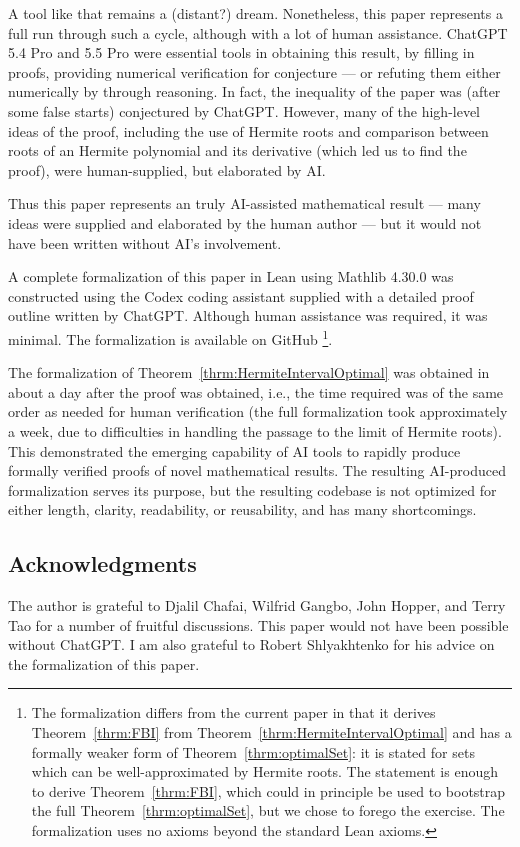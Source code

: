 A tool like that remains a (distant?) dream. Nonetheless, this paper represents a full run through such a cycle, although with a lot of human assistance. ChatGPT 5.4 Pro and 5.5 Pro were essential tools in obtaining this result, by filling in proofs, providing numerical verification for conjecture --- or refuting them either numerically by through reasoning. In fact, the inequality of the paper was  (after some false starts) conjectured by ChatGPT.  However, many of the high-level ideas of the proof, including the use of Hermite roots and comparison between roots of an Hermite polynomial and its derivative (which led us to find the proof), were human-supplied, but elaborated by AI.  

Thus this paper represents an truly AI-assisted mathematical result --- many ideas were supplied and elaborated by the human author --- but it would not have been written without AI's involvement.

A complete formalization of this paper in Lean using Mathlib 4.30.0 was constructed using the Codex coding assistant supplied with a detailed proof outline written by ChatGPT. Although human assistance was required, it was minimal. The formalization is available on GitHub \cite{githublink}\footnote{The formalization differs from the current paper in that it derives Theorem~\ref{thrm:FBI} from Theorem~\ref{thrm:HermiteIntervalOptimal} and has a formally weaker form of Theorem~\ref{thrm:optimalSet}: it is stated for sets which can be well-approximated by Hermite roots. The statement is enough to derive Theorem~\ref{thrm:FBI}, which could in principle be used to bootstrap the full Theorem~\ref{thrm:optimalSet}, but we chose to forego the exercise. The formalization uses no axioms beyond the standard Lean axioms.}.

The formalization of Theorem~\ref{thrm:HermiteIntervalOptimal} was obtained in about a day after the proof was obtained, i.e., the time required was of the same order as needed for human verification (the full formalization took approximately a week, due to difficulties in handling the passage to the limit of Hermite roots). This demonstrated the emerging capability of AI tools to rapidly produce formally verified proofs of novel mathematical results.   The resulting AI-produced formalization serves its purpose, but the resulting codebase is not optimized for either length, clarity, readability, or reusability, and has many shortcomings.

\subsection{Acknowledgments}  The author is grateful to Djalil Chafai, Wilfrid Gangbo, John Hopper, and Terry Tao for a number of fruitful discussions. This paper would not have been possible without ChatGPT.  I am also grateful to Robert Shlyakhtenko for his advice on the formalization of this paper.

